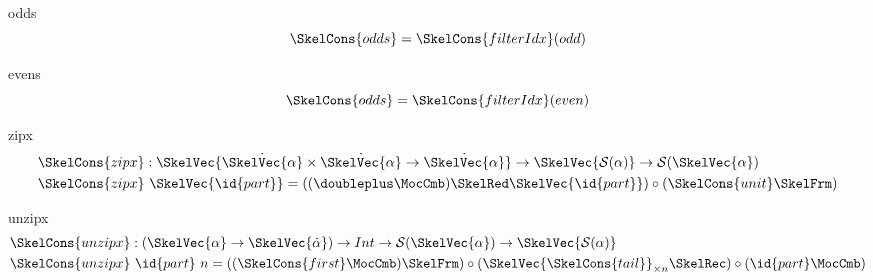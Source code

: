 \documentclass[preview]{standalone}
\begin{document}
\begin{docimage}{odds}
  \begin{equation*}
    \SkelCons{odds} = \SkelCons{filterIdx}(odd)   
  \end{equation*}
\end{docimage}


\begin{docimage}{evens}
  \begin{equation*}
    \SkelCons{odds} = \SkelCons{filterIdx}(even)   
  \end{equation*}
\end{docimage}

\begin{docimage}{zipx}
  \begin{align*}
    \SkelCons{zipx} &: \SkelVec{\dot{\SkelVec{\alpha}} \times \dot{\SkelVec{\alpha}} \rightarrow \dot{\SkelVec{\alpha}}}
                      \rightarrow \SkelVec{\mathcal{S}(\alpha)} \rightarrow \mathcal{S}(\SkelVec{\alpha}) \\
    \SkelCons{zipx} &\ \SkelVec{\id{part}} = ((\doubleplus \MocCmb) \SkelRed \SkelVec{\id{part}}) \circ (\SkelCons{unit} \SkelFrm) 
  \end{align*}
\end{docimage}

\begin{docimage}{unzipx}
  \begin{align*}
    \SkelCons{unzipx} &: (\SkelVec{\alpha} \rightarrow \SkelVec{\dot{\alpha}}) \rightarrow Int 
                        \rightarrow \mathcal{S}(\SkelVec{\alpha}) \rightarrow \SkelVec{\mathcal{S}(\alpha)}  \\
    \SkelCons{unzipx} &\ \id{part}\ n = ((\SkelCons{first} \MocCmb) \SkelFrm) \circ (\SkelVec{\SkelCons{tail}}_{\times n} \SkelRec )
                        \circ (\id{part} \MocCmb) 
  \end{align*}
\end{docimage}
\end{document}
